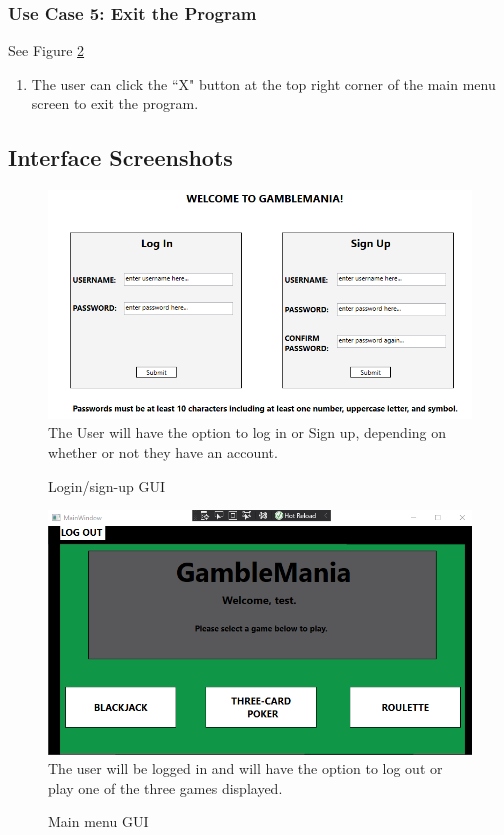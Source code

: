 \documentclass[10pt,conference,onecolumn,compsoc]{IEEEtran}
\begin{document}
\subsubsection{Use Case 5: Exit the Program}
See Figure \ref{fig:main}
\begin{enumerate}
\item The user can click the ``X" button at the top right corner of the main menu screen to exit the program.
\end{enumerate}

\newpage
\subsection{Interface Screenshots}

\begin{figure}[h]
\caption{Login/sign-up GUI}
\includegraphics[scale=0.7]{Sign_Up}
\label{fig:login}
\centering
\newline The User will have the option to log in or Sign up, depending on whether or not they have an account.
\end{figure}

\begin{figure}[h]
\caption{Main menu GUI}
\includegraphics[scale=0.7]{Main_Menu}
\label{fig:main}
\centering
\newline The user will be logged in and will have the option to log out or play one of the three games displayed.
\end{figure}
\end{document}
